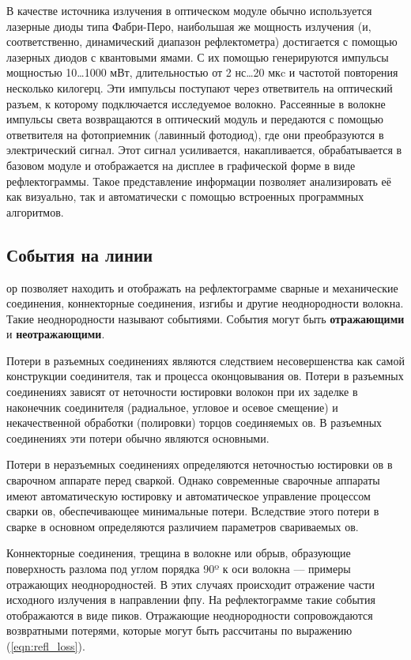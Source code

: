 В качестве источника излучения в оптическом модуле обычно используется лазерные диоды типа Фабри-Перо, наибольшая же мощность излучения (и, соответственно, динамический диапазон рефлектометра) достигается с помощью лазерных диодов с квантовыми ямами. С их помощью генерируются импульсы мощностью 10\dots1000 мВт, длительностью от 2 нс\dots20 мкc и частотой повторения несколько килогерц. Эти импульсы поступают через ответвитель на оптический разъем, к которому подключается исследуемое волокно. Рассеянные в волокне импульсы света возвращаются в оптический модуль и передаются с помощью ответвителя на фотоприемник (лавинный фотодиод), где они преобразуются в электрический сигнал. Этот сигнал усиливается, накапливается, обрабатывается в базовом модуле и отображается на дисплее в графической форме в виде рефлектограммы. Такое представление информации позволяет анализировать её как визуально, так и автоматически с помощью встроенных программных алгоритмов.~\cite{listvin:reflectometria}

\subsection{События на линии}

\acrshort{ор} позволяет находить и отображать на рефлектограмме сварные и механические соединения, коннекторные соединения, изгибы и другие неоднородности волокна. Такие неоднородности называют событиями. 
События могут быть \textbf{отражающими} и \textbf{неотражающими}. 

Потери в разъемных соединениях являются следствием несовершенства как самой конструкции соединителя, так и процесса оконцовывания \acrshort{ов}. Потери в разъемных соединениях зависят от неточности юстировки волокон при их заделке в наконечник соединителя (радиальное, угловое и осевое смещение) и некачественной обработки (полировки) торцов соединяемых \acrshort{ов}. В разъемных соединениях эти потери обычно являются основными.

Потери в неразъемных соединениях определяются неточностью
юстировки \acrshort{ов} в сварочном аппарате перед сваркой. Однако современные сварочные аппараты имеют автоматическую юстировку и автоматическое управление процессом сварки \acrshort{ов}, обеспечивающее минимальные потери. Вследствие этого потери в сварке в основном определяются различием параметров свариваемых \acrshort{ов}.~\cite{bilina:izmerenie_parametrov}

Коннекторные соединения, трещина в волокне или обрыв, образующие поверхность разлома под углом порядка 90º к оси волокна --- примеры отражающих неоднородностей. В этих случаях происходит отражение части исходного излучения в направлении \acrshort{фпу}. На рефлектограмме такие события отображаются в виде пиков. 
Отражающие неоднородности сопровождаются возвратными потерями, которые могут быть рассчитаны по выражению (\ref{eqn:refl_loss}).

